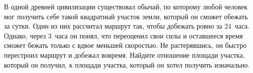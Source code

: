 	В одной древней цивилизации существовал обычай, по которому любой человек мог получить себе такой квадратный участок земли, который он сможет обежать за сутки. Один из них рассчитал маршрут так, чтобы добежать ровно за $24$~часа. Однако, через $3$~часа он понял, что переоценил свои силы и оставшееся время сможет бежать только с вдвое меньшей скоростью. Не растерявшись, он быстро перестроил маршрут и добежал вовремя. Найдите отношение площади участка, который он получил, к площади участка, который он хотел получить изначально.  